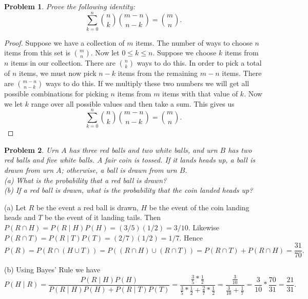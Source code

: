 \documentclass{article}
\newtheorem{problem}{Problem}
\begin{document}
\begin{problem}
Prove the following identity:
\[
\sum_{k=0}^{n} \binom{n}{k} \binom{m-n}{n-k} = \binom{m}{n}.
\]
\end{problem}
\begin{proof}
Suppose we have a collection of $m$ items. The number of ways to choose $n$ items from this set is $\binom{m}{n}$. Now let $0 \leq k \leq n$. Suppose we choose $k$ items from $n$ items in our collection. There are $\binom{n}{k}$ ways to do this. In order to pick a total of $n$ items, we must now pick $n-k$ items from the remaining $m-n$ items. There are $\binom{m-n}{n-k}$ ways to do this. If we multiply these two numbers we will get all possible combinations for picking $n$ items from $m$ items with that value of $k$. Now we let $k$ range over all possible values and then take a sum. This gives us
\[
\sum_{k=0}^{n} \binom{n}{k} \binom{m-n}{n-k} = \binom{m}{n}.
\]
\end{proof}

\begin{problem}
Urn $A$ has three red balls and two white balls, and urn $B$ has two red balls and five white balls. A fair coin is tossed. If it lands heads up, a ball is drawn from urn $A$; otherwise, a ball is drawn from urn $B$.\\
(a) What is the probability that a red ball is drawn?\\
(b) If a red ball is drawn, what is the probability that the coin landed heads up?
\end{problem}

(a) Let $R$ be the event a red ball is drawn, $H$ be the event of the coin landing heads and $T$ be the event of it landing tails. Then $P(R \cap H) = P(R \mid H)P(H) = (3/5)(1/2) = 3/10$. Likewise $P(R \cap T) = P(R \mid T)P(T) = (2/7)(1/2) = 1/7$. Hence
\[
P(R) = P(R \cap (H \cup T)) = P((R \cap H) \cup (R \cap T)) = P(R \cap T) + P(R \cap H) = \frac{31}{70}.
\]

(b) Using Bayes' Rule we have
\[
P(H \mid R) = \frac{P(R \mid H) P(H)}{P(R \mid H)P(H) + P(R \mid T)P(T)} = \frac{\frac{3}{5} * \frac{1}{2}}{\frac{3}{5} * \frac{1}{2} + \frac{2}{7} * \frac{1}{2}} = \frac{\frac{3}{10}}{\frac{3}{10} + \frac{1}{7}} = \frac{3}{10} * \frac{70}{31} = \frac{21}{31}.
\]
\end{document}

